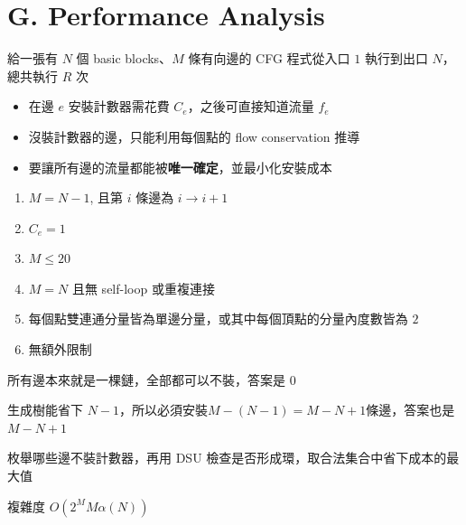 \section{G. Performance Analysis}

\begin{frame}{}
    給一張有 $N$ 個 basic blocks、$M$ 條有向邊的 CFG
    程式從入口 $1$ 執行到出口 $N$，總共執行 $R$ 次

    \begin{itemize}
        \item 在邊 $e$ 安裝計數器需花費 $C_e$，之後可直接知道流量 $f_e$
        \item 沒裝計數器的邊，只能利用每個點的 flow conservation 推導
        \item 要讓所有邊的流量都能被\textbf{唯一確定}，並最小化安裝成本
    \end{itemize}
\end{frame}

\begin{frame}{}
    \begin{enumerate}
        \item{$M = N - 1$, 且第 $i$ 條邊為 $i \to i + 1$}
        \item{$C_e = 1$}
        \item{$M \le 20$}
        \item{$M = N$ 且無 self-loop 或重複連接}
        \item{每個點雙連通分量皆為單邊分量，或其中每個頂點的分量內度數皆為 $2$}
        \item{無額外限制}
    \end{enumerate}
\end{frame}

\begin{frame}{}
    所有邊本來就是一棵鏈，全部都可以不裝，答案是 $0$
\end{frame}

\begin{frame}{}
    生成樹能省下 $N-1$，所以必須安裝$M-(N-1)=M-N+1$條邊，答案也是 $M-N+1$
\end{frame}

\begin{frame}{}
    枚舉哪些邊不裝計數器，再用 DSU 檢查是否形成環，取合法集合中省下成本的最大值

    複雜度 $O(2^M M\alpha(N))$
\end{frame}

